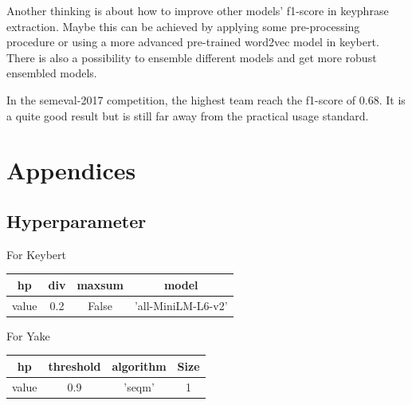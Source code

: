 \documentclass[11pt]{article}
\begin{document}
   \noindent
  \vspace{11pt}
  Another thinking is about how to improve other models' f1-score in keyphrase extraction. Maybe this can be achieved by applying some pre-processing procedure or using a more advanced pre-trained word2vec model in keybert. There is also a possibility to ensemble different models and get more robust ensembled models. 
  
  \vspace{11pt}
  \noindent
  In the semeval-2017 competition, the highest team reach the f1-score of 0.68. It is a quite good result but is still
  far away from the practical usage standard.

  
  
  

  \newpage
  \appendix
  \section{Appendices}

  \subsection{Hyperparameter}
  For Keybert
  \begin{center}
      \begin{tabular}{cccc}
          \hline
          hp& div&maxsum & model\\
          \hline
          value& 0.2& False& 'all-MiniLM-L6-v2' \\
          \hline
      \end{tabular}
  \end{center}
  \noindent
  For Yake
  \begin{center}
      \begin{tabular}{cccc}
          \hline
          hp& threshold& algorithm& Size\\
          \hline
          value&  0.9& 'seqm'& 1 \\
          \hline
      \end{tabular}
  \end{center}
    
\end{document}
